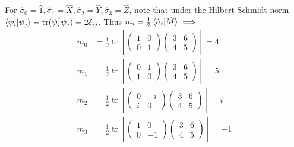 \documentclass[11pt, answers]{exam}
\begin{document}
	\begin{solution}
		For $\hat{\sigma}_0=\hat{1},\hat{\sigma}_1=\hat{X},\hat{\sigma}_2=\hat{Y},\hat{\sigma}_3=\hat{Z}$, note that under the Hilbert-Schmidt norm $\braket{\psi_i|\psi_j}=\operatorname{tr}(\psi_i^\dagger\psi_j)=2\delta_{ij}$. Thus $m_i = \frac{1}{2}\braket{\hat{\sigma}_i|\hat{M}} \implies$
		\begin{align*}
			m_0 &= \frac{1}{2}\operatorname{tr}
			\left[\begin{pmatrix}
				1 & 0 \\
				0 & 1
			\end{pmatrix}
			\begin{pmatrix}
				3 & 6 \\
				4 & 5
			\end{pmatrix}\right] = 4 \\
			m_1 & = \frac{1}{2}\operatorname{tr}
			\left[\begin{pmatrix}
				0 & 1 \\
				1 & 0
			\end{pmatrix}
			\begin{pmatrix}
				3 & 6 \\
				4 & 5
			\end{pmatrix}\right] = 5 \\
			m_2 &= \frac{1}{2}\operatorname{tr}
			\left[\begin{pmatrix}
				0 & -i \\
				i & 0
			\end{pmatrix}
			\begin{pmatrix}
				3 & 6 \\
				4 & 5
			\end{pmatrix}\right]
			= i \\
			m_3 &= \frac{1}{2}
			\operatorname{tr}
			\left[\begin{pmatrix}
				1 & 0 \\
				0 & -1
			\end{pmatrix}
			\begin{pmatrix}
				3 & 6 \\
				4 & 5
			\end{pmatrix}\right] = -1
		\end{align*}
	\end{solution}
\end{document}
